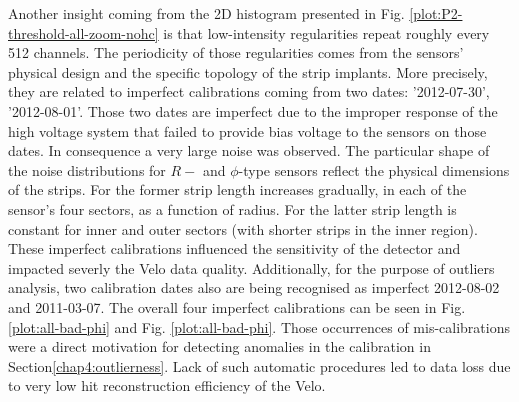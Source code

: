 Another insight coming from the 2D histogram presented in Fig. \ref{plot:P2-threshold-all-zoom-nohc} is that low-intensity regularities repeat roughly every 512 channels. The periodicity of those regularities comes from the sensors' physical design and the specific topology of the strip implants.
More precisely, they are related to imperfect calibrations coming from two dates:  '2012-07-30', '2012-08-01'.
Those two dates are imperfect due to the improper response of the high voltage system that failed to provide bias voltage to the sensors on those dates. In consequence a very large noise was observed. The particular shape of the noise distributions for $R-$ and $\phi$-type sensors reflect the physical dimensions of the strips. For the former strip length increases gradually, in each of the sensor's four sectors, as a function of radius. For the latter strip length is constant for inner and outer sectors (with shorter strips in the inner region).
These imperfect calibrations influenced the sensitivity of the detector and impacted severly the Velo data quality. 
Additionally, for the purpose of outliers analysis, two calibration dates also are being recognised as imperfect 2012-08-02 and 2011-03-07.
The overall four imperfect calibrations can be seen in Fig. \ref{plot:all-bad-phi} and Fig. \ref{plot:all-bad-phi}.
Those occurrences of mis-calibrations were a direct motivation for detecting anomalies in the calibration in Section\ref{chap4:outlierness}. Lack of such automatic procedures led to data loss due to very low hit reconstruction efficiency of the Velo.

